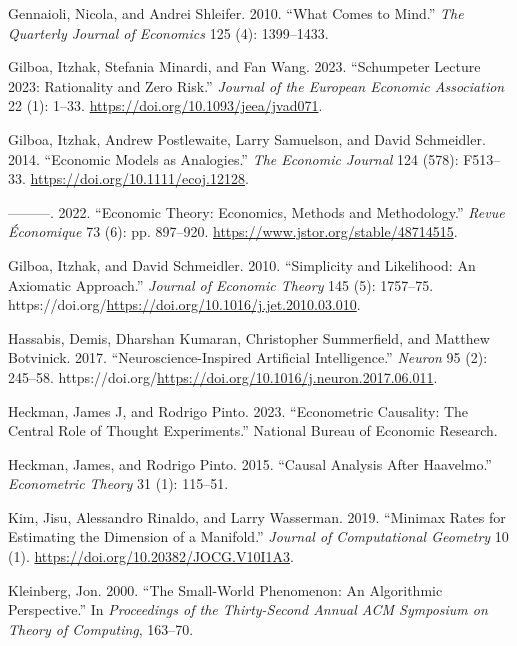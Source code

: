 \documentclass[
]{article}
\newlength{\cslhangindent}
\newenvironment{CSLReferences}[2] %
 {\begin{list}{}{%
  \setlength{\itemindent}{0pt}
  \setlength{\leftmargin}{0pt}
  \setlength{\parsep}{0pt}
  \ifodd #1
   \setlength{\leftmargin}{\cslhangindent}
   \setlength{\itemindent}{-1\cslhangindent}
  \fi
  \setlength{\itemsep}{#2\baselineskip}}}
 {\end{list}}
\begin{document}
\begin{CSLReferences}{1}{0}
Gennaioli, Nicola, and Andrei Shleifer. 2010. {``What Comes to Mind.''}
\emph{The Quarterly Journal of Economics} 125 (4): 1399--1433.

Gilboa, Itzhak, Stefania Minardi, and Fan Wang. 2023. {``{Schumpeter
Lecture 2023: Rationality and Zero Risk}.''} \emph{Journal of the
European Economic Association} 22 (1): 1--33.
\url{https://doi.org/10.1093/jeea/jvad071}.

Gilboa, Itzhak, Andrew Postlewaite, Larry Samuelson, and David
Schmeidler. 2014. {``{Economic Models as Analogies}.''} \emph{The
Economic Journal} 124 (578): F513--33.
\url{https://doi.org/10.1111/ecoj.12128}.

---------. 2022. {``Economic Theory: Economics, Methods and
Methodology.''} \emph{Revue Économique} 73 (6): pp. 897--920.
\url{https://www.jstor.org/stable/48714515}.

Gilboa, Itzhak, and David Schmeidler. 2010. {``Simplicity and
Likelihood: An Axiomatic Approach.''} \emph{Journal of Economic Theory}
145 (5): 1757--75.
https://doi.org/\url{https://doi.org/10.1016/j.jet.2010.03.010}.

Hassabis, Demis, Dharshan Kumaran, Christopher Summerfield, and Matthew
Botvinick. 2017. {``Neuroscience-Inspired Artificial Intelligence.''}
\emph{Neuron} 95 (2): 245--58.
https://doi.org/\url{https://doi.org/10.1016/j.neuron.2017.06.011}.

Heckman, James J, and Rodrigo Pinto. 2023. {``Econometric Causality: The
Central Role of Thought Experiments.''} National Bureau of Economic
Research.

Heckman, James, and Rodrigo Pinto. 2015. {``Causal Analysis After
Haavelmo.''} \emph{Econometric Theory} 31 (1): 115--51.

Kim, Jisu, Alessandro Rinaldo, and Larry Wasserman. 2019. {``Minimax
Rates for Estimating the Dimension of a Manifold.''} \emph{Journal of
Computational Geometry} 10 (1).
\url{https://doi.org/10.20382/JOCG.V10I1A3}.

Kleinberg, Jon. 2000. {``The Small-World Phenomenon: An Algorithmic
Perspective.''} In \emph{Proceedings of the Thirty-Second Annual ACM
Symposium on Theory of Computing}, 163--70.


\end{CSLReferences}
\end{document}
